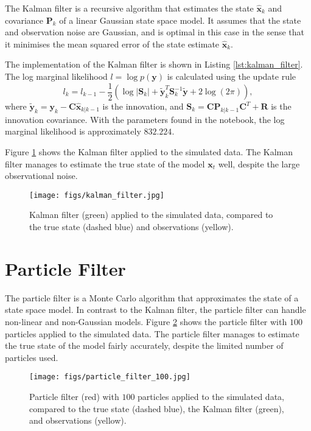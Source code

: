 \documentclass[12pt]{article}
\begin{document}
The Kalman filter is a recursive algorithm that estimates the state $\hat{\mathbf{x}}_{k}$ and covariance $\mathbf{P}_{k}$ of a linear Gaussian state space model.
It assumes that the state and observation noise are Gaussian, and is optimal in this case in the sense that it minimises the mean squared error of the state estimate $\hat{\mathbf{x}}_{k}$.

The implementation of the Kalman filter is shown in Listing \ref{lst:kalman_filter}. 
The log marginal likelihood $l = \log p(\mathbf{y})$ is calculated using the update rule \cite{lutkepohl2013introduction}
\begin{equation}
    l_k = l_{k-1} - \frac{1}{2} \left( \log \left| \mathbf{S}_{k} \right| + \tilde{\mathbf{y}}_{k}^{T} \mathbf{S}_{k}^{-1} \tilde{\mathbf{y}} + 2 \log(2\pi) \right),
\end{equation}
where $\tilde{\mathbf{y}}_{k} = \mathbf{y}_{k} - \mathbf{C} \hat{\mathbf{x}}_{k|k-1}$ is the innovation, 
and $\mathbf{S}_{k} = \mathbf{C} \mathbf{P}_{k|k-1} \mathbf{C}^{T} + \mathbf{R}$ is the innovation covariance. With the parameters found in the notebook, the log marginal likelihood is approximately $832.224$.

Figure \ref{fig:kalman_filter} shows the Kalman filter applied to the simulated data. 
The Kalman filter manages to estimate the true state of the model $\mathbf{x}_{t}$ well, despite the large observational noise.
 
\begin{figure}[H]
    \centering
    \texttt{[image: figs/kalman\_filter.jpg]}
    \caption{Kalman filter (green) applied to the simulated data, compared to the true state (dashed blue) and observations (yellow).}
    \label{fig:kalman_filter}
\end{figure}

\section{Particle Filter}
The particle filter is a Monte Carlo algorithm that approximates the state of a state space model. 
In contrast to the Kalman filter, the particle filter can handle non-linear and non-Gaussian models.
Figure \ref{fig:particle_filter_100} shows the particle filter with $100$ particles applied to the simulated data. 
The particle filter manages to estimate the true state of the model fairly accurately, despite the limited number of particles used.
\begin{figure}[H]
    \centering
    \texttt{[image: figs/particle\_filter\_100.jpg]}
    \caption{Particle filter (red) with $100$ particles applied to the simulated data, compared to the true state (dashed blue), the Kalman filter (green), and observations (yellow).}
    \label{fig:particle_filter_100}
\end{figure}
\end{document}
